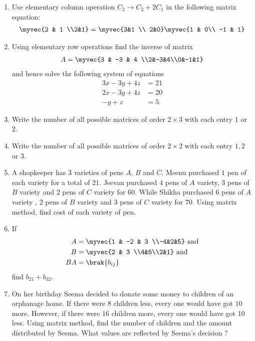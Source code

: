 \begin{enumerate}
    \item Use elementary column operation $C_2 \rightarrow C_2 + 2C_1$ in the following matrix equation:
          \begin{align*}
              \myvec{2 & 1 \\2&1} = \myvec{3&1 \\ 2&0} \myvec{1 & 0\\ -1 & 1}
          \end{align*}
    \item Using elementary row operations find the inverse of matrix
          \begin{align*}
              A =\myvec{3 & -3 & 4 \\2&-3&4\\0&-1&1}
          \end{align*}
          and hence solve thr following system of equations
          \begin{align*}
              3x-3y+4z & =21 \\
              2x-3y+4z & =20 \\
              -y+z     & =5.
          \end{align*}
    \item Write the number of all possible matrices of order $2\times 3$ with each entry $1$ or $2$.
    \item Write the number of all possible matrices of order $2\times2$ with each entry $1,2$ or $3$.
    \item A shopkeeper has $3$ varieties of pens $A$, $B$ and $C$. Meenu purchased $1$ pen of each variety for a total of \rupee $21$. Jeevan purchased $4$ pens of $A$ variety, $3$ pens of $B$ variety and $2$ pens of $C$ variety for \rupee $60$. While Shikha purchased $6$ pens of $A$ variety , $2$ pens of $B$ variety and $3$ pens of $C$ variety for \rupee $70$. Using matrix method, find cost of each variety of pen.
    \item If
          \begin{align*}
              A  & =\myvec{1      & -2 & 3 \\-4&2&5} \text{ and}\\
              B  & =\myvec{2      & 3      \\4&5\\2&1} \text{ and}\\
              BA & =\brak{b_{ij}}
          \end{align*}
          find $b_{21} + b_{32}$.
    \item On her birthday Seema decided to donate some money to children of an orphanage home. If there were $8$ children less, every one would have got \rupee $10$ more. However, if there were $16$ children more, every one would have got \rupee $10$ less. Using matrix method, find the number of children and the amount distributed by Seema. What values are reflected by Seema's decision ?

\end{enumerate}
